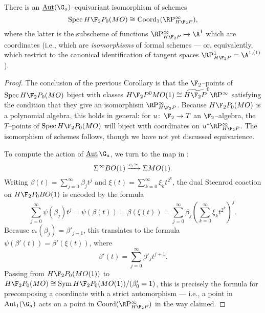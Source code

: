 \begin{corollary}
There is an $\InternalAut(\G_a)$--equivariant isomorphism of schemes \[\Spec H\F_2P_0(MO) \cong \Coord_1(\RP^\infty_{H\F_2P}),\] where the latter is the subscheme of functions $\RP^\infty_{H\F_2P} \to \A^1$ which are coordinates (i.e., which are \emph{isomorphisms} of formal schemes --- or, equivalently, which restrict to the canonical identification of tangent spaces $\RP^1_{H\F_2P} = \A^{1,(1)}$).
\end{corollary}
\begin{proof}
The conclusion of the previous Corollary is that the $\F_2$--points of $\Spec H\F_2P_0(MO)$ biject with classes $H\F_2P^0 MO(1) \cong \widetilde{H\F_2P}^0 \RP^\infty$ satisfying the condition that they give an isomorphism $\RP^\infty_{H\F_2P}$.  Because $H\F_2P_0(MO)$ is a polynomial algebra, this holds in general: for $u\co \F_2 \to T$ an $\F_2$--algebra, the $T$--points of $\Spec H\F_2P_0(MO)$ will biject with coordinates on $u^* \RP^\infty_{H\F_2P}$.  The isomorphism of schemes follows, though we have not yet discussed equivarience.

To compute the action of $\InternalAut \G_a$, we turn to the map in : \[\Sigma^\infty BO(1) \xrightarrow{c, \simeq} \Sigma MO(1).\]  Writing $\beta(t) = \sum_{j=0}^\infty \beta_j t^j$ and $\xi(t) = \sum_{k=0}^\infty \xi_k t^{2^k}$, the dual Steenrod coaction on $H\F_2P_0 BO(1)$ is encoded by the formula \[\sum_{j=0}^\infty \psi(\beta_j) t^j = \psi(\beta(t)) = \beta(\xi(t)) = \sum_{j=0}^\infty \beta_j \left(\sum_{k=0}^\infty \xi_k t^{2^k} \right)^j.\]  Because $c_*(\beta_j) = \beta'_{j-1}$, this translates to the formula $\psi(\beta'(t)) = \beta'(\xi(t))$, where \[\beta'(t) = \sum_{j=0}^\infty \beta'_j t^{j+1}.\]  Passing from $H\F_2P_0(MO(1))$ to $H\F_2P_0(MO) \cong \Sym H\F_2P_0(MO(1)) / (\beta'_0 = 1)$, this is precisely the formula for precomposing a coordinate with a strict automorphism --- i.e., a point in $\Aut_1(\G_a)$ acts on a point in $\Coord(\RP^\infty_{H\F_2P})$ in the way claimed.
\end{proof}

